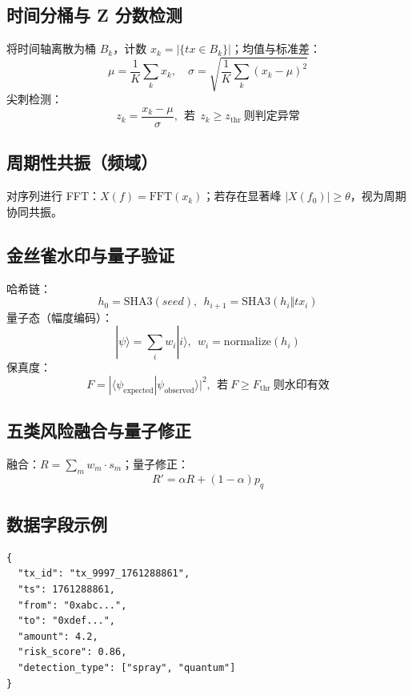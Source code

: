 \documentclass[12pt]{article}
\begin{document}
\subsection*{时间分桶与 Z 分数检测}
将时间轴离散为桶 $B_k$，计数 $x_k=|\{tx\in B_k\}|$；均值与标准差：
\begin{equation}
\mu=\frac{1}{K}\sum\limits_{k}x_k,\quad \sigma=\sqrt{\frac{1}{K}\sum\limits_{k}(x_k-\mu)^2}
\end{equation}
尖刺检测：
\begin{equation}
z_k=\frac{x_k-\mu}{\sigma},\ \ \text{若}\ \ z_k\ge z_{\mathrm{thr}}\ \text{则判定异常}
\end{equation}

\subsection*{周期性共振（频域）}
对序列进行 FFT：$X(f)=\mathrm{FFT}(x_k)$；若存在显著峰 $|X(f_0)|\ge \theta$，视为周期协同共振。

\subsection*{金丝雀水印与量子验证}
哈希链：
\begin{equation}
h_0=\mathrm{SHA3}(seed),\ \ h_{i+1}=\mathrm{SHA3}(h_i\Vert tx_i)
\end{equation}
量子态（幅度编码）：
\begin{equation}
|\psi\rangle=\sum\limits_{i}w_i|i\rangle,\ \ w_i=\mathrm{normalize}(h_i)
\end{equation}
保真度：
\begin{equation}
F=|\langle \psi_{\text{expected}}|\psi_{\text{observed}}\rangle|^2,\ \ \text{若}\ F\ge F_{\mathrm{thr}}\ \text{则水印有效}
\end{equation}

\subsection*{五类风险融合与量子修正}
融合：$R=\sum\limits_{m} w_m\cdot s_m$；量子修正：
\begin{equation}
R'=\alpha R+(1-\alpha)p_q
\end{equation}

\subsection*{数据字段示例}
\begin{verbatim}
{
  "tx_id": "tx_9997_1761288861",
  "ts": 1761288861,
  "from": "0xabc...",
  "to": "0xdef...",
  "amount": 4.2,
  "risk_score": 0.86,
  "detection_type": ["spray", "quantum"]
}
\end{verbatim}
\end{document}
